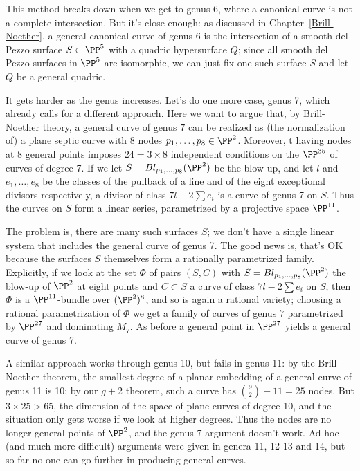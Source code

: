 This method breaks down when we get to genus 6, where a canonical curve is not a complete intersection. But it's close enough: as discussed in Chapter~\ref{Brill-Noether}, a general canonical curve of genus 6 is the intersection of a smooth del Pezzo surface $S \subset \PP^5$ with a quadric hypersurface $Q$; since all smooth del Pezzo surfaces in $\PP^5$ are isomorphic, we can just fix one such surface $S$ and let $Q$ be a general quadric.

It gets harder as the genus increases. Let's do one more case, genus 7, which already calls for a different approach. Here we want to argue that, by Brill-Noether theory, a general curve of genus $7$ can be realized as (the normalization of) a plane septic curve with 8 nodes $p_1,\dots,p_8 \in \PP^2$. Moreover, t having nodes at 8 general points imposes $24= 3\times 8$ independent conditions on the $\PP^{35}$ of curves of degree 7. 
If we let $S = Bl_{p_1,\dots,p_8}(\PP^2)$ be the blow-up, and let $l$ and $e_1,\dots,e_8$ be the classes of the pullback of a line and of the eight exceptional divisors respectively, a divisor of class $7l - 2 \sum e_i$ is a curve of genus 7 on $S$. Thus the curves on $S$ form a linear series, parametrized by a projective space $\PP^{11}$.

The problem is, there are many such surfaces $S$; we don't have a single linear system that includes the general curve of genus 7. The good news is, that's OK because the surfaces $S$ themselves form a rationally parametrized family. Explicitly, if we look at the set $\Phi$ of pairs $(S, C)$ with $S = Bl_{p_1,\dots,p_8}(\PP^2)$  the blow-up of $\PP^2$ at eight points and $C \subset S$ a curve of class $7l - 2 \sum e_i$ on $S$, then $\Phi$ is a $\PP^{11}$-bundle over $(\PP^2)^8$, and so is again a rational variety; choosing a rational parametrization of $\Phi$ we get a family of curves of genus $7$ parametrized by $\PP^{27}$ and dominating $M_7$. As before a general point in $\PP^{27}$ yields a general curve of genus 7.

A similar approach works through genus 10, but fails in genus 11: by the Brill-Noether theorem, the smallest degree of a planar embedding of a general curve of genus 11 is 10; by our $g+2$ theorem, such a curve has ${9\choose 2}-11 = 25$ nodes. But $3 \times 25 > 65$, the dimension of the space of plane curves of degree 10, and the situation only gets worse if we look at higher degrees. Thus the nodes are no longer general points of $\PP^2$, and the genus 7 argument doesn't work. 
 Ad hoc (and much more difficult) arguments were given in genera 11, 12 13 and 14, but so far no-one can go further in producing general curves. 


